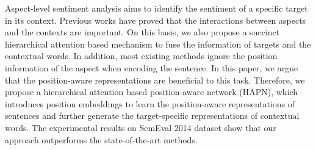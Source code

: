 Aspect-level sentiment analysis aims to identify the sentiment of a specific target in its context. Previous works have proved that the interactions between aspects and the contexts are important. On this basis, we also propose a succinct hierarchical attention based mechanism to fuse the information of targets and the contextual words. In addition, most existing methods ignore the position information of the aspect when encoding the sentence. In this paper, we argue that the position-aware representations are beneficial to this task. Therefore, we propose a hierarchical attention based position-aware network (HAPN), which introduces position embeddings to learn the position-aware representations of sentences and further generate the target-specific representations of contextual words. The experimental results on SemEval 2014 dataset show that our approach outperforms the state-of-the-art methods.
